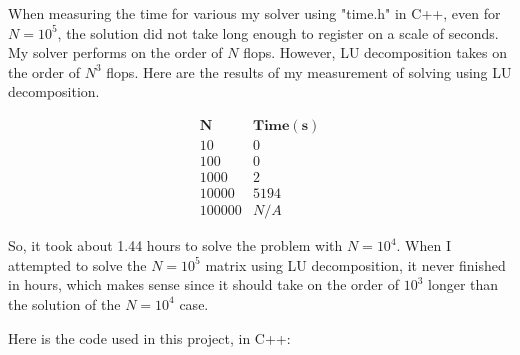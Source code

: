 \documentclass[11pt]{article}
\begin{document}
When measuring the time for various my solver using "time.h" in C++, even for $N=10^5$, the solution did not take long enough to register on a scale of seconds. My solver performs on the order of $N$ flops. However, LU decomposition takes on the order of $N^3$ flops. Here are the results of my measurement of solving using LU decomposition.

$$
\begin{matrix}
\mathbf{N} & \mathbf{Time (s)}\\
10 & 0\\
100 & 0\\
1000 & 2\\
10000 & 5194\\
100000 & N/A
\end{matrix}
$$

So, it took about 1.44 hours to solve the problem with $N=10^4$. When I attempted to solve the $N=10^5$ matrix using LU decomposition, it never finished in hours, which makes sense since it should take on the order of $10^3$ longer than the solution of the $N=10^4$ case.

Here is the code used in this project, in C++:
\end{document}

